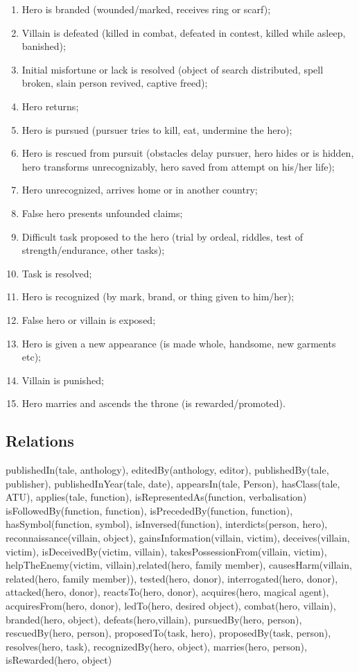 \documentclass[10pt,a4paper]{article}
\begin{document}
\begin{enumerate}
	\item  Hero is branded (wounded/marked, receives ring or scarf);
	 \item  Villain is defeated (killed in combat, defeated in contest, killed
while asleep, banished);
 	\item  Initial misfortune or lack is resolved (object of search
distributed, spell broken, slain person revived, captive freed);
 	\item  Hero returns;
	\item  Hero is pursued (pursuer tries to kill, eat, undermine the hero);
	\item   Hero is rescued from pursuit (obstacles delay pursuer, hero
hides or is hidden, hero transforms unrecognizably, hero saved
from attempt on his/her life);
	\item  Hero unrecognized, arrives home or in another country;
 	\item  False hero presents unfounded claims;
 	\item  Difficult task proposed to the hero (trial by ordeal, riddles, test
of strength/endurance, other tasks);
 	\item  Task is resolved;
 \item  Hero is recognized (by mark, brand, or thing given to
him/her);
 \item False hero or villain is exposed;
 \item  Hero is given a new appearance (is made whole, handsome,
new garments etc);
 \item Villain is punished;
 \item  Hero marries and ascends the throne (is rewarded/promoted).
\end{enumerate}

\subsection{Relations}

publishedIn(tale, anthology), editedBy(anthology, editor), publishedBy(tale, publisher), publishedInYear(tale, date), appearsIn(tale, Person), hasClass(tale, ATU), applies(tale, function), isRepresentedAs(function, verbalisation) isFollowedBy(function, function), isPrecededBy(function, function), hasSymbol(function, symbol), isInversed(function), interdicts(person, hero), reconnaissance(villain, object), gainsInformation(villain, victim), deceives(villain, victim), isDeceivedBy(victim, villain), takesPossessionFrom(villain, victim), helpTheEnemy(victim, villain),related(hero, family member), causesHarm(villain, related(hero, family member)), tested(hero, donor), interrogated(hero, donor), attacked(hero, donor), reactsTo(hero, donor), acquires(hero, magical agent), acquiresFrom(hero, donor), ledTo(hero, desired object), combat(hero, villain), branded(hero, object), defeats(hero,villain), pursuedBy(hero, person), rescuedBy(hero, person), proposedTo(task, hero), proposedBy(task, person), resolves(hero, task), recognizedBy(hero, object), marries(hero, person), isRewarded(hero, object)
 
\end{document}
